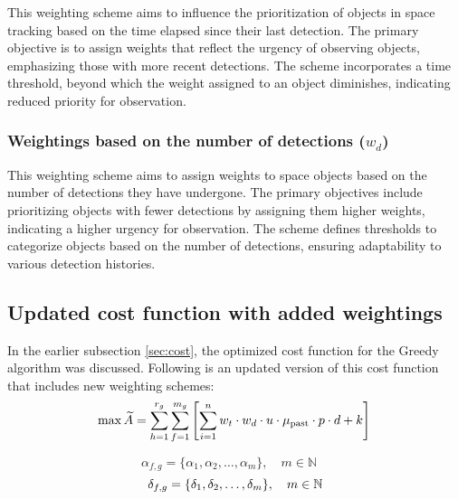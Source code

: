 This weighting scheme aims to influence the prioritization of objects in space tracking based on the time elapsed since their last detection. The primary objective is to assign weights that reflect the urgency of observing objects, emphasizing those with more recent detections. The scheme incorporates a time threshold, beyond which the weight assigned to an object diminishes, indicating reduced priority for observation.\\

\subsubsection{Weightings based on the number of detections ($w_d$)}
This weighting scheme aims to assign weights to space objects based on the number of detections they have undergone. The primary objectives include prioritizing objects with fewer detections by assigning them higher weights, indicating a higher urgency for observation. The scheme defines thresholds to categorize objects based on the number of detections, ensuring adaptability to various detection histories.\\


\subsection{Updated cost function with added weightings}
In the earlier subsection \ref{sec:cost}, the optimized cost function for the Greedy algorithm was discussed. Following is an updated version of this cost function that includes new weighting schemes:\\

\begin{equation}
	\max\widetilde{A} = \sum_{h=1}^{r_g} \sum_{f=1}^{m_g} \left[ \sum_{i=1}^{n} w_t \cdot w_d \cdot u \cdot \mu_{\text{past}} \cdot p \cdot d + k \right] \quad	\\
\end{equation}

\begin{equation}
	\alpha_{f, g} = \{\alpha_1, \alpha_2, \ldots, \alpha_m\}, \quad m \in \mathbb{N} \quad 
\end{equation}
\begin{equation}
	\delta_{f, g} = \{\delta_1, \delta_2, \ldots, \delta_m\}, \quad m \in \mathbb{N} \quad\\
\end{equation}
